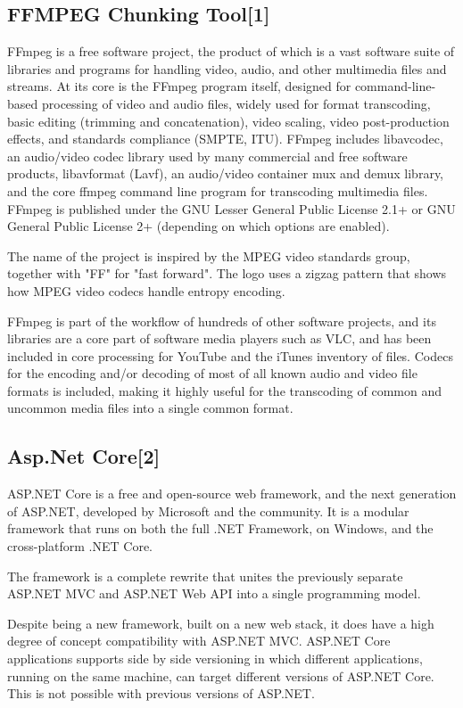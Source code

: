 \documentclass{article}
\begin{document}
		\subsection{FFMPEG Chunking Tool[1]}
			FFmpeg is a free software project, the product of which is a vast software suite of libraries and programs for handling video, audio, and other multimedia files and streams. At its core is the FFmpeg program itself, designed for command-line-based processing of video and audio files, widely used for format transcoding, basic editing (trimming and concatenation), video scaling, video post-production effects, and standards compliance (SMPTE, ITU). FFmpeg includes libavcodec, an audio/video codec library used by many commercial and free software products, libavformat (Lavf), an audio/video container mux and demux library, and the core ffmpeg command line program for transcoding multimedia files. FFmpeg is published under the GNU Lesser General Public License 2.1+ or GNU General Public License 2+ (depending on which options are enabled).

			The name of the project is inspired by the MPEG video standards group, together with "FF" for "fast forward". The logo uses a zigzag pattern that shows how MPEG video codecs handle entropy encoding.

			FFmpeg is part of the workflow of hundreds of other software projects, and its libraries are a core part of software media players such as VLC, and has been included in core processing for YouTube and the iTunes inventory of files. Codecs for the encoding and/or decoding of most of all known audio and video file formats is included, making it highly useful for the transcoding of common and uncommon media files into a single common format.

		\subsection{Asp.Net Core[2]}
			ASP.NET Core is a free and open-source web framework, and the next generation of ASP.NET, developed by Microsoft and the community. It is a modular framework that runs on both the full .NET Framework, on Windows, and the cross-platform .NET Core.

			The framework is a complete rewrite that unites the previously separate ASP.NET MVC and ASP.NET Web API into a single programming model.

			Despite being a new framework, built on a new web stack, it does have a high degree of concept compatibility with ASP.NET MVC. ASP.NET Core applications supports side by side versioning in which different applications, running on the same machine, can target different versions of ASP.NET Core. This is not possible with previous versions of ASP.NET.
\end{document}
